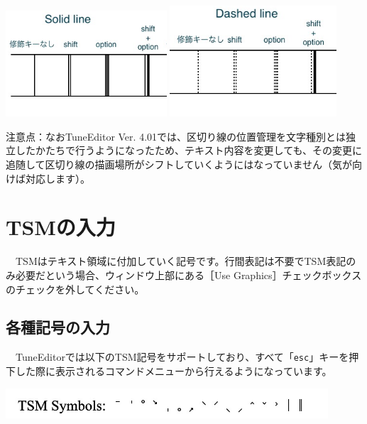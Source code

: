 \medskip
\begin{center}
	\includegraphics[width=6cm]{SolidLine.png}\label{SolidLineSample}
	\includegraphics[width=6.2cm]{DashdLine.png}\label{DashedLineSample}
 \end{center}
\medskip


\textsf{注意点：}なおTuneEditor Ver. 4.01では、区切り線の位置管理を文字種別とは独立したかたちで行うようになったため、テキスト内容を変更しても、その変更に追随して区切り線の描画場所がシフトしていくようにはなっていません（気が向けば対応します）。


\newpage
\section{TSMの入力}

　TSMはテキスト領域に付加していく記号です。行間表記は不要でTSM表記のみ必要だという場合、ウィンドウ上部にある［Use Graphics］チェックボックスのチェックを外してください。

\subsection{各種記号の入力}

　TuneEditorでは以下のTSM記号をサポートしており、すべて「\texttt{esc}」キーを押下した際に表示されるコマンドメニューから行えるようになっています。

\begin{center}
	\includegraphics[width=12cm]{TSMsymbols.jpeg}
 \end{center}

